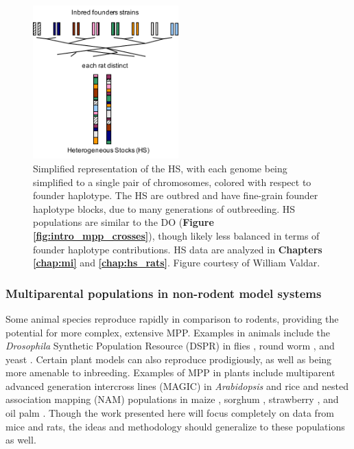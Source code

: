 \begin{figure}
\centering
\includegraphics[width=0.5\textwidth, trim={0in 0in 0in 0in}, clip]{figures/1-introduction/hs_cartoon.pdf}
\caption[Simplified depiction of Heterogeneous Stocks]{Simplified representation of the HS, with each genome being simplified to a single pair of chromosomes, colored with respect to founder haplotype. The HS are outbred and have fine-grain founder haplotype blocks, due to many generations of outbreeding. HS populations are similar to the DO (\textbf{Figure \ref{fig:intro_mpp_crosses}}), though likely less balanced in terms of founder haplotype contributions. HS data are analyzed in \textbf{Chapters \ref{chap:mi}} and \textbf{\ref{chap:hs_rats}}. Figure courtesy of William Valdar. \label{fig:hs_cartoon}}
\end{figure}

\subsubsection{Multiparental populations in non-rodent model systems}

Some animal species reproduce rapidly in comparison to rodents, providing the potential for more complex, extensive MPP. Examples in animals include the \textit{Drosophila} Synthetic Population Resource (DSPR) in flies \citep{King2012,King2012a,Long2014,King2017,Najarro2017,Stanley2017}, round worm \citep{Noble2017}, and yeast \citep{Cubillos2017}. Certain plant models can also reproduce prodigiously, as well as being more amenable to inbreeding. Examples of MPP in plants include multiparent advanced generation intercross lines (MAGIC) in \textit{Arabidopsis} \citep{Kover2009,Huang2011} and rice \citep{Bandillo2013,Raghavan2017} and nested association mapping (NAM) populations in maize \citep{Buckler2009}, sorghum \citep{Bouchet2017}, strawberry \citep{Mangandi2017}, and oil palm \citep{Tisne2017}. Though the work presented here will focus completely on data from mice and rats, the ideas and methodology should generalize to these populations as well.


